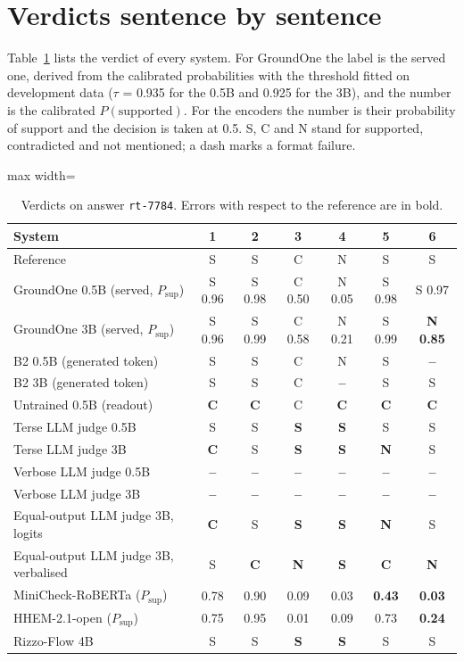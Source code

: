 \section{Verdicts sentence by sentence}

Table~\ref{tab:app-examples} lists the verdict of every system. For GroundOne the label is the served one, derived from
the calibrated probabilities with the threshold fitted on development data ($\tau$ = 0.935 for the 0.5B and 0.925 for the
3B), and the number is the calibrated $P(\text{supported})$. For the encoders the number is their probability of support
and the decision is taken at 0.5. S, C and N stand for supported, contradicted and not mentioned; a dash marks a format
failure.

\begin{table}[htbp]
\centering
\caption{Verdicts on answer \texttt{rt-7784}. Errors with respect to the reference are in bold.}
\label{tab:app-examples}
\small
\begin{adjustbox}{max width=\textwidth}
\begin{tabular}{@{}lcccccc@{}}
\toprule
System & 1 & 2 & 3 & 4 & 5 & 6 \\
\midrule
Reference & S & S & C & N & S & S \\
\midrule
GroundOne 0.5B (served, $P_\mathrm{sup}$) & S 0.96 & S 0.98 & C 0.50 & N 0.05 & S 0.98 & S 0.97 \\
GroundOne 3B (served, $P_\mathrm{sup}$) & S 0.96 & S 0.99 & C 0.58 & N 0.21 & S 0.99 & \textbf{N 0.85} \\
B2 0.5B (generated token) & S & S & C & N & S & \textbf{--} \\
B2 3B (generated token) & S & S & C & \textbf{--} & S & S \\
Untrained 0.5B (readout) & \textbf{C} & \textbf{C} & C & \textbf{C} & \textbf{C} & \textbf{C} \\
Terse LLM judge 0.5B & S & S & \textbf{S} & \textbf{S} & S & S \\
Terse LLM judge 3B & \textbf{C} & S & \textbf{S} & \textbf{S} & \textbf{N} & S \\
Verbose LLM judge 0.5B & \textbf{--} & \textbf{--} & \textbf{--} & \textbf{--} & \textbf{--} & \textbf{--} \\
Verbose LLM judge 3B & \textbf{--} & \textbf{--} & \textbf{--} & \textbf{--} & \textbf{--} & \textbf{--} \\
Equal-output LLM judge 3B, logits & \textbf{C} & S & \textbf{S} & \textbf{S} & \textbf{N} & S \\
Equal-output LLM judge 3B, verbalised & S & \textbf{C} & \textbf{N} & \textbf{S} & \textbf{C} & \textbf{N} \\
MiniCheck-RoBERTa ($P_\mathrm{sup}$) & 0.78 & 0.90 & 0.09 & 0.03 & \textbf{0.43} & \textbf{0.03} \\
HHEM-2.1-open ($P_\mathrm{sup}$) & 0.75 & 0.95 & 0.01 & 0.09 & 0.73 & \textbf{0.24} \\
Rizzo-Flow 4B & S & S & \textbf{S} & \textbf{S} & S & S \\
\bottomrule
\end{tabular}
\end{adjustbox}
\end{table}

